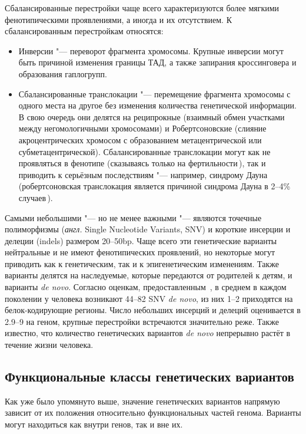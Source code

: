 \documentclass[a4paper,14pt]{extarticle}
\newcommand{\anglia}[1]{\textit{англ.} \textenglish{#1}}
\begin{document}
Сбалансированные перестройки чаще всего характеризуются более мягкими фенотипическими проявлениями, а иногда и их отсутствием.
К сбалансированным перестройкам относятся:

\begin{itemize}
\item Инверсии "--- переворот фрагмента хромосомы.
Крупные инверсии могут быть причиной изменения границы ТАД, а также запирания кроссинговера и образования гаплогрупп.
\item Сбалансированные транслокации "--- перемещение фрагмента хромосомы с одного места на другое без изменения количества генетической информации.
В свою очередь они делятся на реципрокные (взаимный обмен участками между негомологичными хромосомами) и Робертсоновские (слияние акроцентрических хромосом с образованием метацентрической или субметацентрической).
Сбалансированные транслокации могут как не проявляться в фенотипе (сказываясь только на фертильности\,\cite{Dong_2012}), так и приводить к серьёзным последствиям "--- например, синдрому Дауна (робертсоновская транслокация является причиной синдрома Дауна в 2--4\% случаев\,\cite{Asim_2015}).
\end{itemize}

Самыми небольшими "--- но не менее важными "--- являются точечные полиморфизмы (\anglia{Single Nucleotide Variants, SNV}) и короткие инсерции и делеции (indels) размером 20--50bp.
Чаще всего эти генетические варианты нейтральные и не имеют фенотипических проявлений, но некоторые могут приводить как к генетическим, так и к эпигенетическим изменениям.
Также варианты делятся на наследуемые, которые передаются от родителей к детям, и варианты \textit{de novo}.
Согласно оценкам, предоставленным \,\cite{Acuna_Hidalgo_2016}, в среднем в каждом поколении у человека возникают 44--82 SNV \textit{de novo}, из них 1--2 приходятся на белок-кодирующие регионы.
Число небольших инсерций и делеций оценивается в 2.9--9 на геном, крупные перестройки встречаются значительно реже.
Также известно, что количество генетических вариантов \textit{de novo} непрерывно растёт в течение жизни человека.

\subsection{Функциональные классы генетических вариантов}

Как уже было упомянуто выше, значение генетических вариантов напрямую зависит от их положения относительно функциональных частей генома.
Варианты могут находиться как внутри генов, так и вне их.
\end{document}
